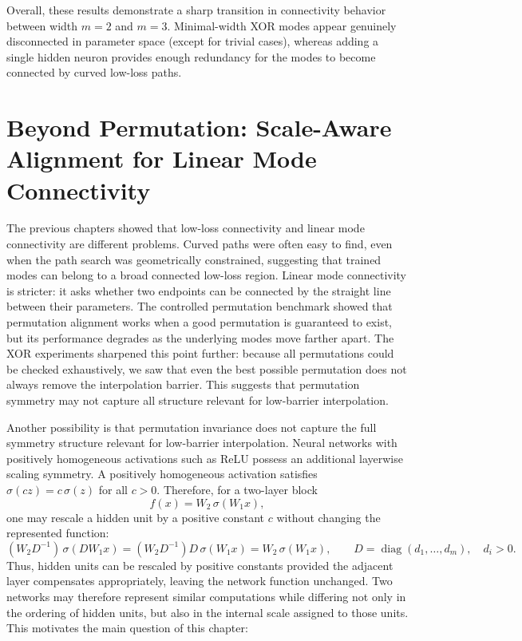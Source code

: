 \documentclass[11pt,a4paper]{report}
\begin{document}
Overall, these results demonstrate a sharp transition in connectivity behavior between width $m=2$ and $m=3$. Minimal-width XOR modes appear genuinely disconnected in parameter space (except for trivial cases), whereas adding a single hidden neuron provides enough redundancy for the modes to become connected by curved low-loss paths.


\chapter{Beyond Permutation: Scale-Aware Alignment for Linear Mode Connectivity}
\label{chap:symmetry-aware}

The previous chapters showed that low-loss connectivity and linear mode connectivity are different problems. Curved paths were often easy to find, even when the path search was geometrically constrained, suggesting that trained modes can belong to a broad connected low-loss region. Linear mode connectivity is stricter: it asks whether two endpoints can be connected by the straight line between their parameters. The controlled permutation benchmark showed that permutation alignment works when a good permutation is guaranteed to exist, but its performance degrades as the underlying modes move farther apart. The XOR experiments sharpened this point further: because all permutations could be checked exhaustively, we saw that even the best possible permutation does not always remove the interpolation barrier. This suggests that permutation symmetry may not capture all structure relevant for low-barrier interpolation. 

Another possibility is that permutation invariance does not capture the full symmetry structure relevant for low-barrier interpolation. Neural networks with positively homogeneous activations such as ReLU possess an additional layerwise scaling symmetry. A positively homogeneous activation satisfies \(\sigma(cz)=c\,\sigma(z)\) for all \(c>0\). Therefore, for a two-layer block
\[
f(x)=W_2\,\sigma(W_1x),
\]
one may rescale a hidden unit by a positive constant \(c\) without changing the represented function:
\[
(W_2D^{-1})\,\sigma(DW_1x)
=(W_2D^{-1})D\,\sigma(W_1x)
=W_2\,\sigma(W_1x), \qquad
D=\operatorname{diag}(d_1,\dots,d_m),\quad d_i>0.
\]
Thus, hidden units can be rescaled by positive constants provided the adjacent layer compensates appropriately, leaving the network function unchanged. Two networks may therefore represent similar computations while differing not only in the ordering of hidden units, but also in the internal scale assigned to those units. This motivates the main question of this chapter:
\end{document}
